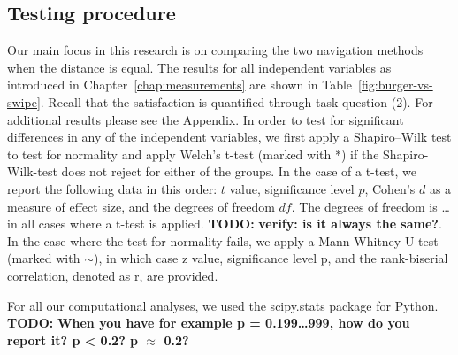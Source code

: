 \documentclass{sig-alternate-05-2015}
\newcommand{\todo}{\textbf{TODO:} \textbf}
\begin{document}
\subsection{Testing procedure}
Our main focus in this research is on comparing the two navigation methods when the distance is equal.
The results for all independent variables as introduced in Chapter~\ref{chap:measurements} are shown in Table~\ref{fig:burger-vs-swipe}. Recall that the
satisfaction is quantified through task question (2). For additional results please see the Appendix.
In order to test for significant differences in any of the independent variables, we first apply a Shapiro–Wilk test to 
test for normality and apply Welch's t-test (marked with *) if the Shapiro-Wilk-test does not reject for either of the groups.
In the case of a t-test, we report the following data in this order: $t$ value, significance level $p$, Cohen's $d$ as a measure of effect size, and the degrees of
freedom $df$. 
The degrees of freedom is \ldots in all cases where a t-test is applied. \todo{verify: is it always the same?}.
In the case where the test for normality fails, we apply a Mann-Whitney-U test (marked with $\sim$), in which case z value, significance level p, and
the rank-biserial correlation, denoted as r, are provided.

For all our computational analyses, we used the scipy.stats package for Python.
\todo{When you have for example p = 0.199\ldots999, how do you report it? p < 0.2? p $\approx$ 0.2?}
\begin{table}[!h]
\centering
\caption{Comparing burger and swipe for same d}
\label{fig:burger-vs-swipe}
\end{table}
\end{document}
